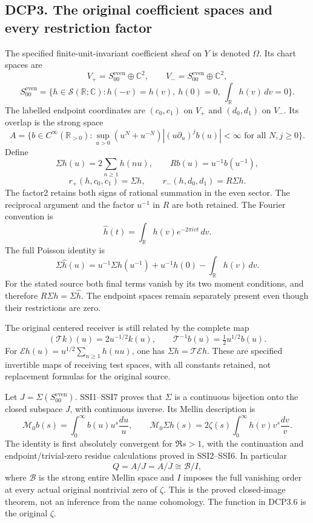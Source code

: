 \subsection{DCP3. The original coefficient spaces and every restriction
factor}\label{dcp3.-the-original-coefficient-spaces-and-every-restriction-factor}

The specified finite-unit-invariant coefficient sheaf on \(Y\) is
denoted \(\Omega\). Its chart spaces are \[
 V_+=S_{00}^{\mathrm{even}}\oplus\mathbb C^2,\qquad
 V_-=S_{00}^{\mathrm{even}}\oplus\mathbb C^2,
\] \[
 S_{00}^{\mathrm{even}}
 =\{h\in\mathcal S(\mathbb R;\mathbb C):
 h(-v)=h(v),\ h(0)=0,\ \int_{\mathbb R}h(v)\,dv=0\}.
\tag{DCP3.1}
\] The labelled endpoint coordinates are \((c_0,c_1)\) on \(V_+\) and
\((d_0,d_1)\) on \(V_-\). Its overlap is the strong space \[
 A=\{b\in C^\infty(\mathbb R_{>0}):
 \sup_{u>0}(u^N+u^{-N})|(u\partial_u)^j b(u)|<\infty
 \text{ for all }N,j\ge0\}.
\tag{DCP3.2}
\] Define \[
 \Sigma h(u)=2\sum_{n\ge1}h(nu),\qquad
 Rb(u)=u^{-1}b(u^{-1}),
\] \[
 r_+(h,c_0,c_1)=\Sigma h,\qquad
 r_-(h,d_0,d_1)=R\Sigma h.
\tag{DCP3.3}
\] The factor2 retains both signs of rational summation in the even
sector. The reciprocal argument and the factor \(u^{-1}\) in \(R\) are
both retained. The Fourier convention is \[
 \widehat h(t)=\int_{\mathbb R}h(v)e^{-2\pi ivt}\,dv .
\] The full Poisson identity is \[
 \Sigma\widehat h(u)
 =u^{-1}\Sigma h(u^{-1})+u^{-1}h(0)-\int_{\mathbb R}h(v)\,dv .
\tag{DCP3.4}
\] For the stated source both final terms vanish by its two moment
conditions, and therefore \(R\Sigma h=\Sigma\widehat h\). The endpoint
spaces remain separately present even though their restrictions are
zero.

The original centered receiver is still related by the complete map \[
 (\mathcal T k)(u)=2u^{-1/2}k(u),\qquad
 \mathcal T^{-1}b(u)=\tfrac12u^{1/2}b(u).
\tag{DCP3.5}
\] For \(\mathcal E h(u)=u^{1/2}\sum_{n\ge1}h(nu)\), one has
\(\Sigma h=\mathcal T\mathcal E h\). These are specified invertible maps
of receiving test spaces, with all constants retained, not replacement
formulas for the original source.

Let \(J=\Sigma(S_{00}^{\mathrm{even}})\). SSI1--SSI7 proves that
\(\Sigma\) is a continuous bijection onto the closed subspace \(J\),
with continuous inverse. Its Mellin description is \[
 \mathcal M_0 b(s)=\int_0^\infty b(u)u^s\frac{du}{u},\qquad
 \mathcal M_0\Sigma h(s)=2\zeta(s)\int_0^\infty h(v)v^s\frac{dv}{v}.
\tag{DCP3.6}
\] The identity is first absolutely convergent for \(\Re s>1\), with the
continuation and endpoint/trivial-zero residue calculations proved in
SSI2--SSI6. In particular \[
 Q=A/J=A/\overline J
 \cong\mathcal B/I,
\tag{DCP3.7}
\] where \(\mathcal B\) is the strong entire Mellin space and \(I\)
imposes the full vanishing order at every actual original nontrivial
zero of \(\zeta\). This is the proved closed-image theorem, not an
inference from the name cohomology. The function in DCP3.6 is the
original \(\zeta\).

